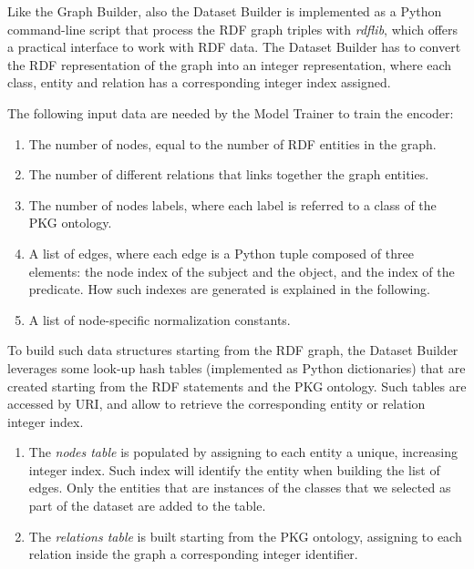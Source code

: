 \documentclass[%
    corpo=13.5pt,
    twoside,
    oldstyle,
    tipotesi=magistrale,
    greek,
    evenboxes
]{toptesi}
\begin{document}
Like the Graph Builder, also the Dataset Builder is implemented as a
Python command-line script that process the RDF graph triples with \emph{rdflib},
which offers a practical interface to work with RDF data.
The Dataset Builder has to convert the RDF representation of the graph into
an integer representation, where each class, entity and relation has a
corresponding integer index assigned.

The following input data are needed by the Model Trainer to train the
encoder:

\begin{enumerate}
    \item The number of nodes, equal to the number of RDF entities in the graph.
    \item The number of different relations that links together the graph
        entities.
    \item The number of nodes labels, where each label is referred to a class of
        the PKG ontology.
    \item A list of edges, where each edge is a Python tuple composed of three
        elements: the node index of the subject and the object, and the
        index of the predicate. How such indexes are generated is
        explained in the following.
    \item A list of node-specific normalization constants.
\end{enumerate}

To build such data structures starting from the RDF graph, the Dataset Builder
leverages some look-up hash tables (implemented as Python dictionaries) that are
created starting from the RDF statements and the PKG ontology. Such tables
are accessed by URI, and allow to retrieve the corresponding entity or
relation integer index.

\begin{enumerate}
    \item The \emph{nodes table} is populated by assigning to each entity
    a unique, increasing integer index. Such index will identify the entity when
    building the list of edges. Only the entities that are instances of the
    classes that we selected as part of the dataset are added to the table.

    \item The \emph{relations table} is built starting from the PKG ontology,
    assigning to each relation inside the graph a corresponding integer
    identifier.
\end{enumerate}
\end{document}
